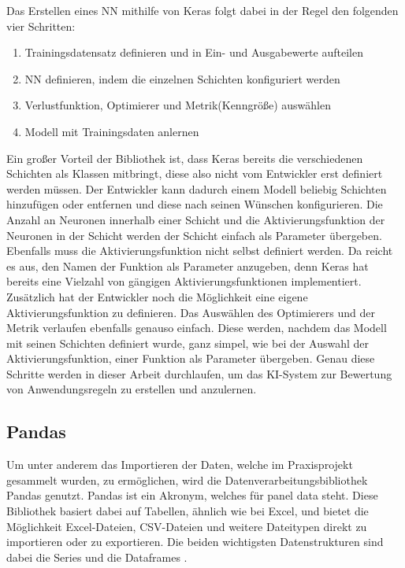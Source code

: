 Das Erstellen eines \ac{NN} mithilfe von Keras folgt dabei in der Regel den folgenden vier Schritten:
\begin{enumerate}
    \item Trainingsdatensatz definieren und in Ein- und Ausgabewerte aufteilen \cite[vgl. S.92]{DL_PY}
    \item \ac{NN} definieren, indem die einzelnen Schichten konfiguriert werden \cite[vgl. S.92]{DL_PY}
    \item Verlustfunktion, Optimierer und Metrik(Kenngröße) auswählen \cite[vgl. S.92]{DL_PY}
    \item Modell mit Trainingsdaten anlernen \cite[vgl. S.92]{DL_PY}
\end{enumerate}
Ein großer Vorteil der Bibliothek ist, dass Keras bereits die verschiedenen Schichten als Klassen mitbringt, diese also nicht vom Entwickler erst definiert werden müssen.
Der Entwickler kann dadurch einem Modell beliebig Schichten hinzufügen oder entfernen und diese nach seinen Wünschen konfigurieren. 
Die Anzahl an Neuronen innerhalb einer Schicht und die Aktivierungsfunktion der Neuronen in der Schicht werden der Schicht einfach als Parameter übergeben. 
Ebenfalls muss die Aktivierungsfunktion nicht selbst definiert werden. Da reicht es aus, den Namen der Funktion als Parameter anzugeben, denn Keras hat bereits eine 
Vielzahl von gängigen Aktivierungsfunktionen implementiert. Zusätzlich hat der Entwickler noch die Möglichkeit eine eigene Aktivierungsfunktion zu definieren.
Das Auswählen des Optimierers und der Metrik verlaufen ebenfalls genauso einfach. Diese werden, nachdem das Modell mit seinen Schichten 
definiert wurde, ganz simpel, wie bei der Auswahl der Aktivierungsfunktion, einer Funktion als Parameter übergeben.
Genau diese Schritte werden in dieser Arbeit durchlaufen, um das \ac{KI}-System zur Bewertung von Anwendungsregeln zu erstellen und anzulernen.

\subsection{Pandas}

Um unter anderem das Importieren der Daten, welche im Praxisprojekt gesammelt wurden, zu ermöglichen, wird die Datenverarbeitungsbibliothek Pandas genutzt.
Pandas ist ein Akronym, welches für panel data steht. Diese Bibliothek basiert dabei auf Tabellen, ähnlich wie bei Excel, und bietet die Möglichkeit
Excel-Dateien, CSV-Dateien und weitere Dateitypen direkt zu importieren oder zu exportieren. Die beiden wichtigsten Datenstrukturen sind dabei die
Series und die Dataframes \cite[vgl. S.253]{NumerischesPython}. 


